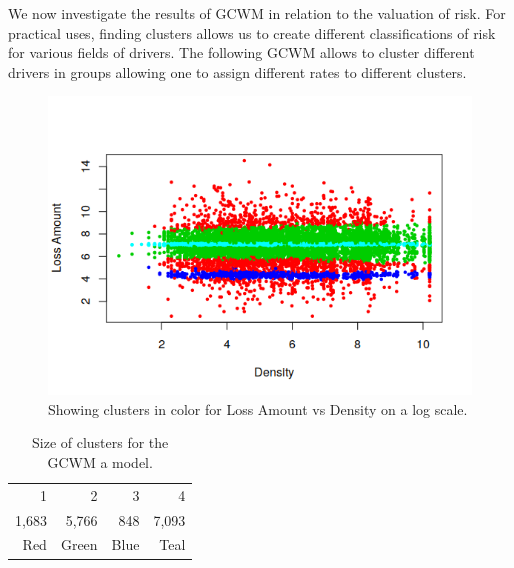 \documentclass[11pt,letterpaper]{article}
\numberwithin{equation}{section}
\numberwithin{equation}{section}
\numberwithin{equation}{section}
\begin{document}
	We now investigate the results of GCWM in relation to the valuation of risk. For practical uses, finding clusters allows us to create different classifications of risk for various fields of drivers. The following GCWM allows to cluster different drivers in groups allowing one to assign different rates to different clusters.
\begin{figure}[!htb]
\caption{Showing clusters in color for Loss Amount vs Density on a log scale.}
\label{fig:vet1}
\begin{center}
\includegraphics[scale=0.83]{SeverityPlot}
\end{center}
\end{figure}
\begin{table}[!htb]
\centering
\caption{Size of clusters for the GCWM a model.}
\label{table:sizeSev}
\begin{tabular}{rrrr}
\hline\hline
1   & 2  &  3   & 4    \\
1,683 & 5,766 & 848 & 7,093 \\
Red & Green & Blue & Teal \\
\hline\hline
\end{tabular}
\end{table}
\end{document}
